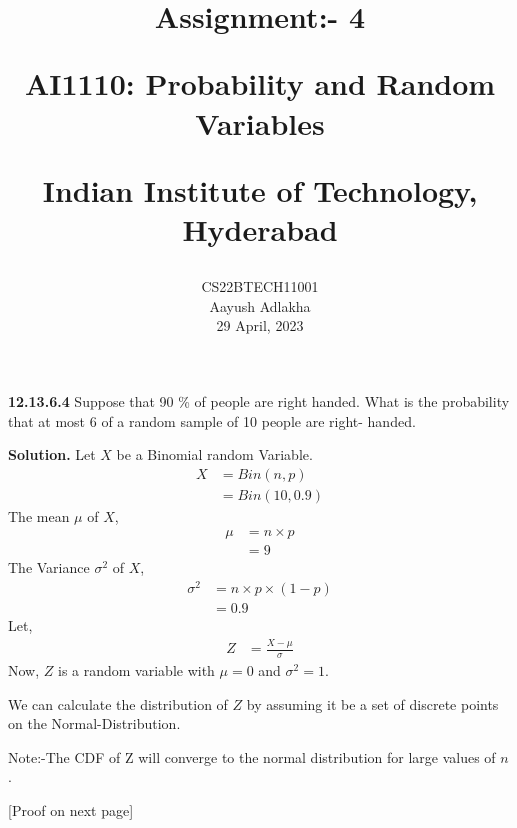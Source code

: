 \documentclass[journal,12pt,twocolumn]{IEEEtran}
\begin{document}
\let\vec\mathbf


\vspace{3cm}

\title{
	Assignment:- 4
 
	\Large AI1110: Probability and Random Variables
 
	\Large Indian Institute of Technology, Hyderabad
}
\author{
	CS22BTECH11001
	
	Aayush Adlakha
 
	29 April, 2023
}






\maketitle

\newpage


\bigskip
\renewcommand{\thefigure}{\theenumi}
\renewcommand{\thetable}{\theenumi}
\textbf{12.13.6.4}
Suppose that 90 \% of people are right handed. What is the probability that
at most 6 of a random sample of 10 people are right-
handed.

\textbf{Solution.}
Let $X$ be a Binomial random Variable.
\begin{align}
    X&=Bin(n,p)\\
    &=Bin(10,0.9)
\end{align}
The mean $\mu$ of $X$,
\begin{align}
    \mu &= n\times p\\
    &= 9
\end{align}
The Variance $\sigma^2$ of $X$,
\begin{align}
    \sigma^2 &= n\times p\times (1-p)\\
    &= 0.9
\end{align}
Let,
\begin{align}
    Z&=\frac{X-\mu}{\sigma}
\end{align}
Now, $Z$ is a random variable with $\mu=0$ and $\sigma^2=1$.

We can calculate the distribution of $Z$ by assuming it be a set of discrete points on the Normal-Distribution.

Note:-The CDF of Z will converge to the normal distribution for large values of $n$.

[Proof on next page]
\end{document}
